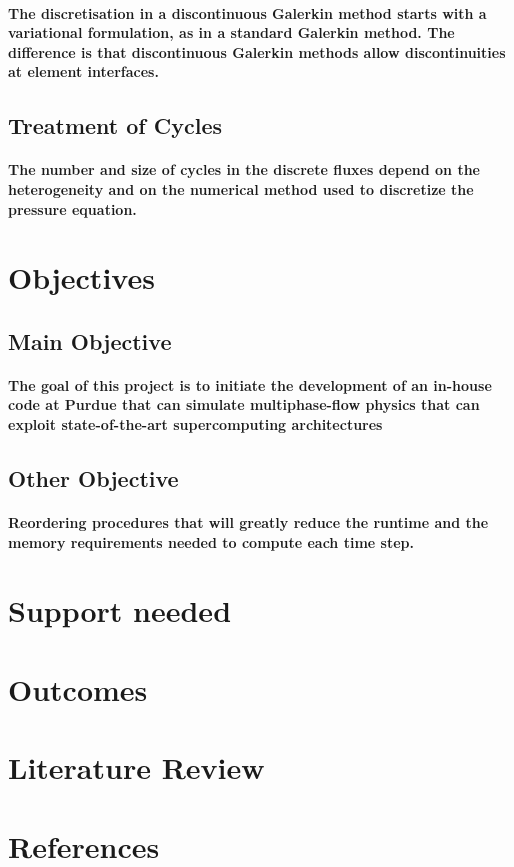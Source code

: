 \documentclass{article}
\begin{document}
 	\paragraph{The discretisation in a discontinuous Galerkin method starts with a variational formulation, as in a standard Galerkin method. The difference is that discontinuous Galerkin methods allow discontinuities
	at element interfaces.}
	
\subsection{Treatment of Cycles}
	\paragraph{The number and size of cycles in the discrete fluxes depend on the heterogeneity and on the numerical method used to discretize the pressure equation.}
	
	
\section{Objectives}
          \subsection{Main Objective}
	\paragraph{The goal of this project is to initiate the development of an in-house code at Purdue that can simulate multiphase-flow physics that can exploit state-of-the-art supercomputing architectures}
          \subsection{Other Objective}
	\paragraph{Reordering procedures that will greatly reduce the runtime and the memory requirements needed to compute each time step.}
	
\section{Support needed}

\section{Outcomes}
	\section{Literature Review}
	\section{References}
\end{document}
